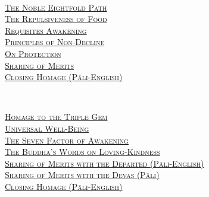 {  \clearpage
  \hspace{0pt}
\vfill

  {\libertinusFont\selectfont\textbf{\textsc{\fontsize{18}{12}\selectfont{}}}}\\

  \textsc{\fontsize{14.4}{28}\selectfont
    \hyperref[noble-eightfold-path]{The Noble Eightfold Path} \ifdesktopversion\else\pageref{noble-eightfold-path}\fi\\
    \hyperref[repulsiveness-of-food]{The Repulsiveness of Food} \ifdesktopversion\else\pageref{repulsiveness-of-food}\fi\\
    \hyperref[requisites-for-awakening]{Requisites Awakening} \ifdesktopversion\else\pageref{requisites-for-awakening}\fi\\
    \hyperref[principles-of-non-decline]{Principles of Non-Decline} \ifdesktopversion\else\pageref{principles-of-non-decline}\fi\\
    \hyperref[protection]{On Protection} \ifdesktopversion\else\pageref{protection}\fi\\
    \hyperref[sharing-all-merits]{Sharing of Merits} \ifdesktopversion\else\pageref{sharing-all-merits}\fi\\
    \hyperref[closing-homage]{Closing Homage (Pāli-English)} \ifdesktopversion\else\pageref{closing-homage}\fi\\
  }

  \vspace{1.0cm}

  {\libertinusFont\selectfont\textbf{\textsc{\fontsize{18}{12}\selectfont{}}}}\\

  \textsc{\fontsize{14.4}{28}\selectfont
    \hyperref[dedication-of-offerings]{Homage to the Triple Gem} \ifdesktopversion\else\pageref{dedication-of-offerings}\fi\\
    \hyperref[universal-well-being]{Universal Well-Being} \ifdesktopversion\else\pageref{universal-well-being}\fi\\
    \hyperref[seven-factors-of-awakening]{The Seven Factor of Awakening} \ifdesktopversion\else\pageref{seven-factors-of-awakening}\fi\\
    \hyperref[words-on-loving-kindness]{The Buddha's Words on Loving-Kindness} \ifdesktopversion\else\pageref{words-on-loving-kindness}\fi\\
    \hyperref[sharing-merits-departed]{Sharing of Merits with the Departed (Pāli-English)} \ifdesktopversion\else\pageref{sharing-merits-departed}\fi\\
    \hyperref[sharing-merits-devas]{Sharing of Merits with the Devas (Pāli)} \ifdesktopversion\else\pageref{sharing-merits-devas}\fi\\
    \hyperref[closing-homage]{Closing Homage (Pāli-English)} \ifdesktopversion\else\pageref{closing-homage}\fi\\
  }

}

